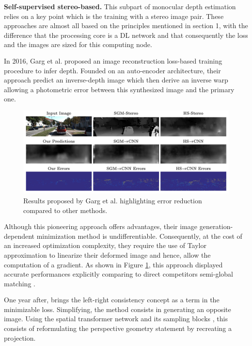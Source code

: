 \textbf{Self-supervised stereo-based. } This subpart of monocular depth estimation relies on a key point which is the training with a stereo image pair. These approaches are almost all based on the principles mentioned in section 1, with the difference that the processing core is a DL network and that consequently the loss and the images are sized for this computing node. 


In 2016, Garg et al.\cite{garg2016unsupervised} proposed an image reconstruction loss-based training procedure to infer depth. Founded on an auto-encoder architecture, their approach predict an inverse-depth image which then derive an inverse warp allowing a photometric error between this synthesized image and the primary one.
\begin{figure}[h]
	\centering
	\includegraphics[width=0.8\linewidth]{Figures/SOA/illugarg}
	\caption[Results proposed by Garg et al.]{Results proposed by Garg et al. \cite{garg2016unsupervised} highlighting error reduction compared to other methods.}
	\label{illugarg}
\end{figure}


Although this pioneering approach offers advantages, their image generation-dependent minimization method is undifferentiable. Consequently, at the cost of an increased optimization complexity, they require the use of Taylor approximation to linearize their deformed image and hence, allow the computation of a gradient. As shown in Figure \ref{illugarg}, this approach displayed accurate performances explicitly comparing to direct competitors semi-global matching \cite{hirschmuller2007stereo}.


One year after, \cite{godard2017unsupervised} brings the left-right consistency concept as a term in the minimizable loss. Simplifying, the method consists in generating an opposite image. Using the spatial transformer network and its sampling blocks \cite{jaderberg2015spatial}, this consists of reformulating the perspective geometry statement by recreating a projection.

